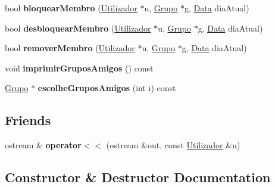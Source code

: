 \begin{DoxyCompactItemize}
\item 
\hypertarget{class_utilizador_a70f4f75f649f4ca5aefebc99e556a20b}{}bool {\bfseries bloquear\+Membro} (\hyperlink{class_utilizador}{Utilizador} $\ast$u, \hyperlink{class_grupo}{Grupo} $\ast$g, \hyperlink{class_data}{Data} dia\+Atual)\label{class_utilizador_a70f4f75f649f4ca5aefebc99e556a20b}

\item 
\hypertarget{class_utilizador_a7424cd944ea535338280e821666768f7}{}bool {\bfseries desbloquear\+Membro} (\hyperlink{class_utilizador}{Utilizador} $\ast$u, \hyperlink{class_grupo}{Grupo} $\ast$g, \hyperlink{class_data}{Data} dia\+Atual)\label{class_utilizador_a7424cd944ea535338280e821666768f7}

\item 
\hypertarget{class_utilizador_a05e62bd42a3e3a324cea8d9c998c2391}{}bool {\bfseries remover\+Membro} (\hyperlink{class_utilizador}{Utilizador} $\ast$u, \hyperlink{class_grupo}{Grupo} $\ast$g, \hyperlink{class_data}{Data} dia\+Atual)\label{class_utilizador_a05e62bd42a3e3a324cea8d9c998c2391}

\item 
\hypertarget{class_utilizador_af66c1361f6bb54a587c405adb71d50d5}{}void {\bfseries imprimir\+Grupos\+Amigos} () const \label{class_utilizador_af66c1361f6bb54a587c405adb71d50d5}

\item 
\hypertarget{class_utilizador_a8292ead93b56ba0c48b9fc92265134c3}{}\hyperlink{class_grupo}{Grupo} $\ast$ {\bfseries escolhe\+Grupos\+Amigos} (int i) const \label{class_utilizador_a8292ead93b56ba0c48b9fc92265134c3}

\end{DoxyCompactItemize}
\subsection*{Friends}
\begin{DoxyCompactItemize}
\item 
\hypertarget{class_utilizador_ad02a468bf3828d06a96b41947147c754}{}ostream \& {\bfseries operator$<$$<$} (ostream \&out, const \hyperlink{class_utilizador}{Utilizador} \&u)\label{class_utilizador_ad02a468bf3828d06a96b41947147c754}

\end{DoxyCompactItemize}


\subsection{Constructor \& Destructor Documentation}
\hypertarget{class_utilizador_a264cb21da71b44fc2d5cfb21e58fa24a}{}
